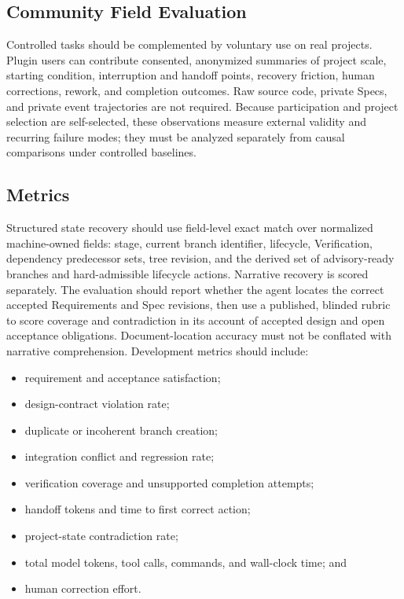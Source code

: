 \documentclass[11pt]{article}
\theoremstyle{definition}
\begin{document}
\subsection{Community Field Evaluation}

Controlled tasks should be complemented by voluntary use on real projects.
Plugin users can contribute consented, anonymized summaries of project scale,
starting condition, interruption and handoff points, recovery friction, human
corrections, rework, and completion outcomes.  Raw source code, private Specs,
and private event trajectories are not required.  Because participation and
project selection are self-selected, these observations measure external
validity and recurring failure modes; they must be analyzed separately from
causal comparisons under controlled baselines.

\subsection{Metrics}

Structured state recovery should use field-level exact match over normalized
machine-owned fields: stage, current branch identifier, lifecycle,
Verification, dependency predecessor sets, tree revision, and the derived set
of advisory-ready branches and hard-admissible lifecycle actions.  Narrative
recovery is scored separately.  The
evaluation should report whether the agent locates the correct accepted
Requirements and Spec revisions, then use a published, blinded rubric to score
coverage and contradiction in its account of accepted design and open
acceptance obligations.  Document-location accuracy must not be conflated with
narrative comprehension.  Development metrics should include:

\begin{itemize}
  \item requirement and acceptance satisfaction;
  \item design-contract violation rate;
  \item duplicate or incoherent branch creation;
  \item integration conflict and regression rate;
  \item verification coverage and unsupported completion attempts;
  \item handoff tokens and time to first correct action;
  \item project-state contradiction rate;
  \item total model tokens, tool calls, commands, and wall-clock time; and
  \item human correction effort.
\end{itemize}
\end{document}
